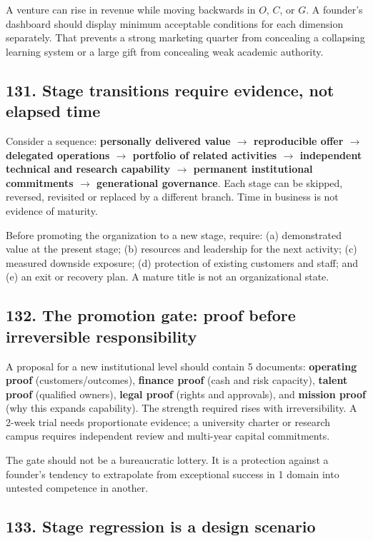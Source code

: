 A venture can rise in revenue while moving backwards in $O$, $C$, or $G$. A founder's dashboard should display minimum acceptable conditions for each dimension separately. That prevents a strong marketing quarter from concealing a collapsing learning system or a large gift from concealing weak academic authority.

\subsection{131. Stage transitions require evidence, not elapsed time}

Consider a sequence: \textbf{personally delivered value $\rightarrow$ reproducible offer $\rightarrow$ delegated operations $\rightarrow$ portfolio of related activities $\rightarrow$ independent technical and research capability $\rightarrow$ permanent institutional commitments $\rightarrow$ generational governance}. Each stage can be skipped, reversed, revisited or replaced by a different branch. Time in business is not evidence of maturity.

Before promoting the organization to a new stage, require: (a) demonstrated value at the present stage; (b) resources and leadership for the next activity; (c) measured downside exposure; (d) protection of existing customers and staff; and (e) an exit or recovery plan. A mature title is not an organizational state.

\subsection{132. The promotion gate: proof before irreversible responsibility}

A proposal for a new institutional level should contain 5 documents: \textbf{operating proof} (customers/\allowbreak outcomes), \textbf{finance proof} (cash and risk capacity), \textbf{talent proof} (qualified owners), \textbf{legal proof} (rights and approvals), and \textbf{mission proof} (why this expands capability). The strength required rises with irreversibility. A 2-week trial needs proportionate evidence; a university charter or research campus requires independent review and multi-year capital commitments.

The gate should not be a bureaucratic lottery. It is a protection against a founder's tendency to extrapolate from exceptional success in 1 domain into untested competence in another.

\subsection{133. Stage regression is a design scenario}

